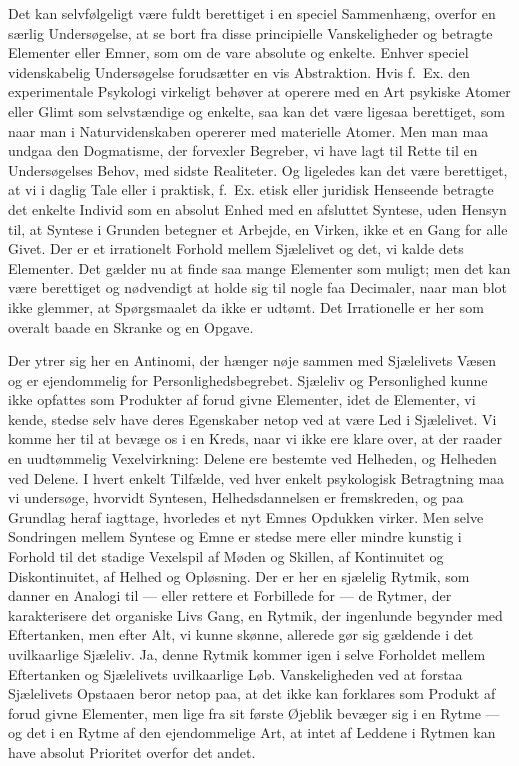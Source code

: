 \documentclass[12pt,a4paper]{book}
\newcommand{\apage}[1]{\marginnote{\footnotesize\textit{[#1]}}}
\begin{document}
Det kan selvfølgeligt være fuldt berettiget i en speciel Sammenhæng,
overfor en særlig Undersøgelse, at se bort fra disse principielle
Vanskeligheder og betragte Elementer eller Emner, som om de vare
absolute og enkelte. Enhver speciel videnskabelig Undersøgelse
forudsætter en vis Abstraktion. Hvis f.\ Ex. den experimentale
Psykologi virkeligt behøver at operere med en Art psykiske Atomer
eller Glimt som selvstændige og enkelte, saa kan det være ligesaa
berettiget, som naar man i Naturvidenskaben opererer med materielle
Atomer. Men man maa undgaa den Dogmatisme, der forvexler Begreber, vi
have lagt til Rette til en Undersøgelses Behov, med sidste Realiteter.
Og ligeledes kan det være berettiget, at vi i daglig Tale eller i
praktisk, f.\ Ex. etisk eller juridisk Henseende betragte det enkelte
Individ som en absolut Enhed med en afsluttet Syntese, uden Hensyn
til, at Syntese i Grunden betegner et Arbejde, en Virken, ikke et en
Gang for alle Givet. Der er et irrationelt Forhold mellem Sjælelivet
og det, vi kalde dets Elementer. Det gælder nu at finde saa mange
Elementer som muligt; men det kan være berettiget og nødvendigt at
holde sig til nogle faa Decimaler, naar man blot ikke glemmer, at
Spørgsmaalet da ikke er udtømt. Det Irrationelle er her som overalt
baade en Skranke og en Opgave.

Der ytrer sig her en Antinomi, der hænger nøje sammen med Sjælelivets
Væsen og er ejendommelig for Personlighedsbegrebet. Sjæleliv og
Personlighed kunne ikke opfattes som Produkter af forud givne
Elementer, idet de Elementer, vi kende, stedse selv have deres
Egenskaber netop ved at være Led i Sjælelivet. Vi komme her til at
bevæge os i en Kreds, naar vi ikke ere klare over, at der raader en
uudtømmelig Vexelvirkning: Delene ere bestemte ved Helheden, og
Helheden ved Delene. I hvert enkelt Tilfælde, ved hver enkelt
psykologisk Betragtning maa vi undersøge, \apage{15} hvorvidt Syntesen,
Helhedsdannelsen er fremskreden, og paa Grundlag heraf iagttage,
hvorledes et nyt Emnes Opdukken virker. Men selve Sondringen mellem
Syntese og Emne er stedse mere eller mindre kunstig i Forhold til det
stadige Vexelspil af Møden og Skillen, af Kontinuitet og
Diskontinuitet, af Helhed og Opløsning. Der er her en sjælelig Rytmik,
som danner en Analogi til --- eller rettere et Forbillede for --- de
Rytmer, der karakterisere det organiske Livs Gang, en Rytmik, der
ingenlunde begynder med Eftertanken, men efter Alt, vi kunne skønne,
allerede gør sig gældende i det uvilkaarlige Sjæleliv. Ja, denne
Rytmik kommer igen i selve Forholdet mellem Eftertanken og Sjælelivets
uvilkaarlige Løb. Vanskeligheden ved at forstaa Sjælelivets Opstaaen
beror netop paa, at det ikke kan forklares som Produkt af forud givne
Elementer, men lige fra sit første Øjeblik bevæger sig i en Rytme ---
og det i en Rytme af den ejendommelige Art, at intet af Leddene i
Rytmen kan have absolut Prioritet overfor det andet.
\end{document}
